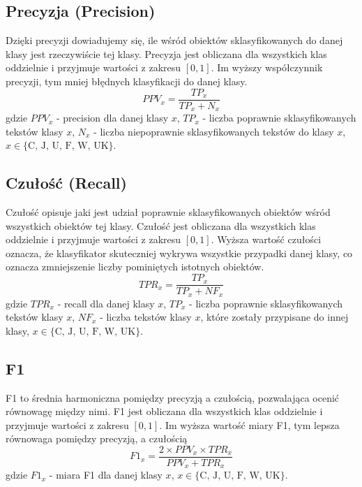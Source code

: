 \documentclass{article}
\begin{document}
\subsection{Precyzja (Precision)}
Dzięki precyzji dowiadujemy się, ile wśród obiektów sklasyfikowanych do danej klasy jest rzeczywiście tej klasy. Precyzja jest obliczana dla wszystkich klas oddzielnie i przyjmuje wartości z zakresu \([0, 1]\). Im wyższy współczynnik precyzji, tym mniej błędnych klasyfikacji do danej klasy.
\begin{equation}
    PPV_x = \frac {TP_x}{TP_x + N_x}
\end{equation}
gdzie \(PPV_x\) - precision dla danej klasy \(x\), \(TP_x\) - liczba poprawnie sklasyfikowanych tekstów klasy \(x\), \(N_x\) - liczba niepoprawnie sklasyfikowanych  tekstów do klasy \(x\), \(x \in \{ \text{C, J, U, F, W, UK} \}\).
\subsection{Czułość (Recall)}
Czułość opisuje jaki jest udział poprawnie sklasyfikowanych obiektów wśród wszystkich obiektów tej klasy. Czułość jest obliczana dla wszystkich klas oddzielnie i przyjmuje wartości z zakresu \([0, 1]\). Wyższa wartość czułości oznacza, że klasyfikator skuteczniej wykrywa wszystkie przypadki danej klasy, co oznacza zmniejszenie liczby pominiętych istotnych obiektów.
\begin{equation}
    TPR_x = \frac {TP_x}{TP_x + NF_x}
\end{equation}
gdzie \(TPR_x\) - recall dla danej klasy \(x\), \(TP_x\) - liczba poprawnie sklasyfikowanych tekstów klasy \(x\), \(NF_x\) - liczba tekstów klasy \(x\), które zostały przypisane do innej klasy, \(x \in \{ \text{C, J, U, F, W, UK} \}\). 
\subsection{F1}
F1 to średnia harmoniczna pomiędzy precyzją a czułością, pozwalająca ocenić równowagę między nimi.  F1 jest obliczana dla wszystkich klas oddzielnie i przyjmuje wartości z zakresu \([0, 1]\). Im wyższa wartość miary F1, tym lepsza równowaga pomiędzy precyzją, a czułością
\begin{equation}
    F1_x = \frac{2 \times PPV_x \times TPR_x}{PPV_x + TPR_x}
\end{equation}
gdzie \(F1_x\) - miara F1 dla danej klasy \(x\), \(x \in \{ \text{C, J, U, F, W, UK} \}\). 
\end{document}
